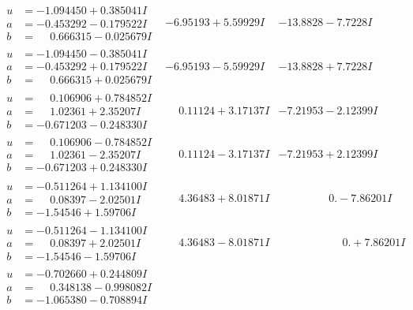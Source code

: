 \documentclass[1p]{elsarticle_modified}
\theoremstyle{definition}
\begin{document}
$$\begin{array}{c|c|c}
\begin{aligned}
u &= -1.094450 + 0.385041 I \\
a &= -0.453292 - 0.179522 I \\
b &= \phantom{-}0.666315 - 0.025679 I\end{aligned}
 & -6.95193 + 5.59929 I & -13.8828 - 7.7228 I \\ \hline\begin{aligned}
u &= -1.094450 - 0.385041 I \\
a &= -0.453292 + 0.179522 I \\
b &= \phantom{-}0.666315 + 0.025679 I\end{aligned}
 & -6.95193 - 5.59929 I & -13.8828 + 7.7228 I \\ \hline\begin{aligned}
u &= \phantom{-}0.106906 + 0.784852 I \\
a &= \phantom{-}1.02361 + 2.35207 I \\
b &= -0.671203 - 0.248330 I\end{aligned}
 & \phantom{-}0.11124 + 3.17137 I & -7.21953 - 2.12399 I \\ \hline\begin{aligned}
u &= \phantom{-}0.106906 - 0.784852 I \\
a &= \phantom{-}1.02361 - 2.35207 I \\
b &= -0.671203 + 0.248330 I\end{aligned}
 & \phantom{-}0.11124 - 3.17137 I & -7.21953 + 2.12399 I \\ \hline\begin{aligned}
u &= -0.511264 + 1.134100 I \\
a &= \phantom{-}0.08397 - 2.02501 I \\
b &= -1.54546 + 1.59706 I\end{aligned}
 & \phantom{-}4.36483 + 8.01871 I & \phantom{-0.000000 } 0. - 7.86201 I \\ \hline\begin{aligned}
u &= -0.511264 - 1.134100 I \\
a &= \phantom{-}0.08397 + 2.02501 I \\
b &= -1.54546 - 1.59706 I\end{aligned}
 & \phantom{-}4.36483 - 8.01871 I & \phantom{-0.000000 -}0. + 7.86201 I \\ \hline\begin{aligned}
u &= -0.702660 + 0.244809 I \\
a &= \phantom{-}0.348138 - 0.998082 I \\
b &= -1.065380 - 0.708894 I\end{aligned}

\end{array}$$
\end{document}
